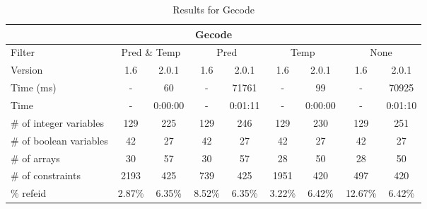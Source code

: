 \documentclass{standalone}
\begin{document}
\begin{table}[H]
\footnotesize
\centering
\begin{tabular}{lc|c|c|c|c|c|c|c}
\multicolumn{9}{c}{Gecode} \\ 
\hline\hline Filter & \multicolumn{2}{c|}{Pred \& Temp} &\multicolumn{2}{c|}{Pred}  & \multicolumn{2}{c|}{Temp} & \multicolumn{2}{c}{None} \\ 
\hline Version & 1.6 & 2.0.1 & 1.6 & 2.0.1 & 1.6 & 2.0.1 & 1.6 & 2.0.1 \\ 
Time (ms)               & - & 60 & - & 71761 & - & 99 & - & 70925 \\ 
Time                    & - & 0:00:00 & - & 0:01:11 & - & 0:00:00 & - & 0:01:10 \\ 
\# of integer variables & 129 & 225 & 129 & 246 & 129 & 230 & 129 & 251 \\ 
\# of boolean variables & 42 & 27 & 42 & 27 & 42 & 27 & 42 & 27 \\ 
\# of arrays            & 30 & 57 & 30 & 57 & 28 & 50 & 28 & 50 \\ 
\# of constraints       & 2193 & 425 & 739 & 425 & 1951 & 420 & 497 & 420 \\ 
\% refeid               & 2.87\% & 6.35\% & 8.52\% & 6.35\% & 3.22\% & 6.42\% & 12.67\% & 6.42\% \\ 
\end{tabular}
\caption{Results for Gecode}\label{tab:res_gecode}
\end{table}
\end{document}
